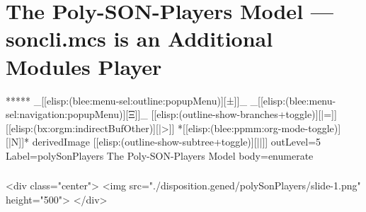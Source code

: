 \section{The Poly-SON-Players Model --- soncli.mcs is an Additional Modules Player}


\begin{whenOrg}
*****  _[[elisp:(blee:menu-sel:outline:popupMenu)][±]]_ _[[elisp:(blee:menu-sel:navigation:popupMenu)][Ξ]]_ [[elisp:(outline-show-branches+toggle)][|=]] [[elisp:(bx:orgm:indirectBufOther)][|>]] *[[elisp:(blee:ppmm:org-mode-toggle)][|N]]*  derivedImage [[elisp:(outline-show-subtree+toggle)][||]] outLevel=5 Label=polySonPlayers The Poly-SON-Players Model body=enumerate

\end{whenOrg}

\begin{htmlonly}

\begin{frame}[fragile,plain,label=polySonPlayers]
    \frametitle{}
    \framesubtitle{}
    \begin{rawhtml}
<div class="center">
<img src="./disposition.gened/polySonPlayers/slide-1.png" height="500">
</div>
    \end{rawhtml}
\end{frame}
\end{htmlonly}

